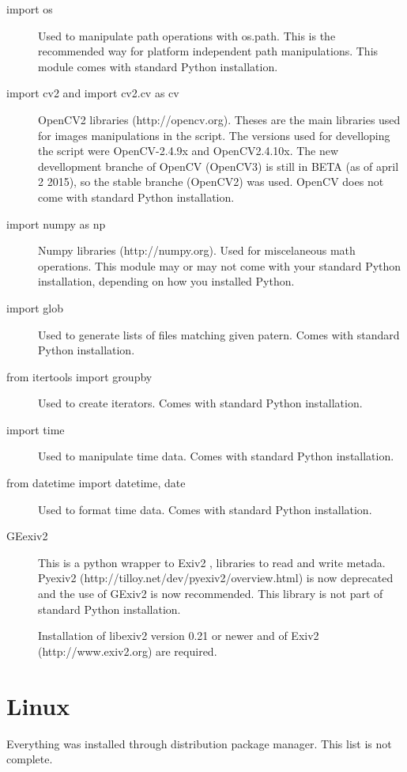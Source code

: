 \documentclass[a4paper, 11pt]{article}
\begin{document}
\begin{description}
\item [import os]
Used to manipulate path operations with os.path. This is the recommended way for platform independent path manipulations. This module comes with standard Python installation.

\item [import cv2 and import cv2.cv as cv]

OpenCV2 libraries (http://opencv.org). Theses are the main libraries used for images manipulations in the script. The versions used for develloping the script were OpenCV-2.4.9x and OpenCV2.4.10x. The new devellopment branche of OpenCV (OpenCV3) is still in BETA (as of april 2 2015), so the stable branche (OpenCV2) was used. OpenCV does not come with standard Python installation.

\item [import numpy as np] Numpy libraries (http://numpy.org). Used for miscelaneous math operations. This module may or may not come with your standard Python installation, depending on how you installed Python.

\item[import glob] Used to generate lists of files matching given patern. Comes with standard Python installation.

\item [from itertools import groupby] Used to create iterators. Comes with standard Python installation.

\item [import time] Used to manipulate time data. Comes with standard Python installation.

\item [from datetime import datetime, date] Used to format time data. Comes with standard Python installation.

\item [GEexiv2] This is a python wrapper to Exiv2 , libraries to read and write metada. Pyexiv2 (http://tilloy.net/dev/pyexiv2/overview.html) is now deprecated and the use of GExiv2 is now recommended. This library is not part of standard Python installation. 

Installation of libexiv2 version 0.21 or newer and of Exiv2 (http://www.exiv2.org) are required.

\end{description}

\section{Linux}
Everything was installed through distribution package manager. This list is not complete.
\end{document}
